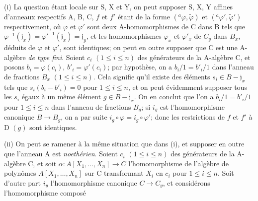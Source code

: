 (i) La question étant locale sur S, X et Y, on peut supposer S, X, Y affines d'anneaux respectifs A, B, C, $f$ et $f'$ étant de la forme $({}^a\varphi,\widetilde\varphi)$ et $({}^a\varphi',\widetilde\varphi')$ respectivement, où $\varphi$ et $\varphi'$ sont deux A-homomorphismes de C dans B tels que $\varphi^{-1}(\mathfrak j_x)=\varphi'^{-1}(\mathfrak j_x)=\mathfrak j_y$, et les homomorphismes $\varphi_x$ et $\varphi'_x$ de $C_y$ dans $B_x$, déduits de $\varphi$ et $\varphi'$, sont identiques; on peut en outre supposer que C est une A-algèbre \textit{de type fini}. Soient $c_i$ $(1\leq i\leq n)$ des générateurs de la A-algèbre C, et posons $b_i=\varphi(c_i)$, $b'_i=\varphi'(c_i)$; par hypothèse, on a $b_i/1=b'_i/1$ dans l'anneau de fractions $B_x$ $(1\leq i\leq n)$. Cela signifie qu'il existe des éléments $s_i\in B-\mathfrak j_x$ tels que $s_i(b_i-b'_i)=0$ pour $1\leq i\leq n$, et on peut évidemment supposer tous les $s_i$ égaux à un même élément $g\in B-\mathfrak j_x$. On en conclut que l'on a $b_i/1=b'_i/1$ pour $1\leq i\leq n$ dans l'anneau de fractions $B_g$; si $i_g$ est l'homomorphisme canonique $B\to B_g$, on a par suite $i_g\circ\varphi=i_g\circ\varphi'$; donc les restrictions de $f$ et $f'$ à D $(g)$ sont identiques.

(ii) On peut se ramener à la même situation que dans (i), et supposer en outre que l'anneau A est \textit{noethérien}. Soient $c_i$ $(1\leq i\leq n)$ des générateurs de la A-algèbre C, et soit $\alpha:A[X_1,\ldots,X_n]\to C$ l'homomorphisme de l'algèbre de polynômes $A[X_1,\ldots,X_n]$ sur C transformant $X_i$ en $c_i$ pour $1\leq i\leq n$. Soit d'autre part $i_y$ l'homomorphisme canonique $C\to C_y$, et considérons l'homomorphisme composé

